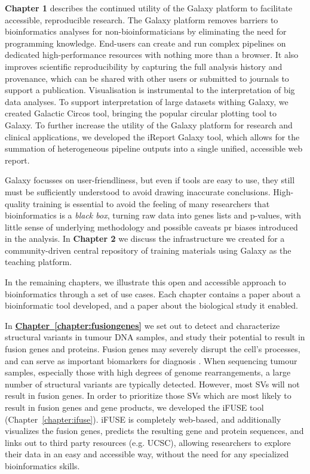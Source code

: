 \begin{justify}
\textbf{Chapter 1} describes the continued utility of the Galaxy platform to facilitate accessible, reproducible research. The Galaxy platform removes barriers to bioinformatics analyses for non-bioinformaticians by eliminating the need for programming knowledge. End-users can create and run complex pipelines on dedicated high-performance resources with nothing more than a browser. It also improves scientific reproducibility by capturing the full analysis history and provenance, which can be shared with other users or submitted to journals to support a publication. Visualisation is instrumental to the interpretation of big data analyses. To support interpretation of large datasets withing Galaxy, we created Galactic Circos tool, bringing the popular circular plotting tool to Galaxy. To further increase the utility of the Galaxy platform for research and clinical applications, we developed the iReport Galaxy tool, which allows for the summation of heterogeneous pipeline outputs into a single unified, accessible web report.


Galaxy focusses on user-friendliness, but even if tools are easy to use, they still must be sufficiently understood to avoid drawing inaccurate conclusions. High-quality training is essential to avoid the feeling of many researchers that bioinformatics is a \emph{black box}, turning raw data into genes lists and p-values, with little sense of underlying methodology and possible caveats pr biases introduced in the analysis. In \textbf{Chapter 2} we discuss the infrastructure we created for a community-driven central repository of training materials using Galaxy as the teaching platform.



In the remaining chapters, we illustrate this open and accessible approach to bioinformatics through a set of use cases. Each chapter contains a paper about a bioinformatic tool developed, and a paper about the biological study it enabled.

In \hyperref[chapter:fustiongenes]{\textbf{Chapter~\ref{chapter:fusiongenes}}} we set out to detect and characterize structural variants in tumour DNA samples, and study their potential to result in fusion genes and proteins.
Fusion genes may severely disrupt the cell's processes, and can serve as important biomarkers for diagnosis \cite{song2020overview,koo2019merging}.
When sequencing tumour samples, especially those with high degrees of genome rearrangements, a large number of structural variants are typically detected.
However, most SVs will not result in fusion genes.
In order to prioritize those SVs which are most likely to result in fusion genes and gene products, we developed the iFUSE tool (Chapter~\ref{chapter:ifuse}).
iFUSE is completely web-based, and additionally visualizes the fusion genes, predicts the resulting gene and protein sequences, and links out to third party resources (e.g. UCSC), allowing researchers to explore their data in an easy and accessible way, without the need for any specialized bioinformatics skills.


\end{justify}
